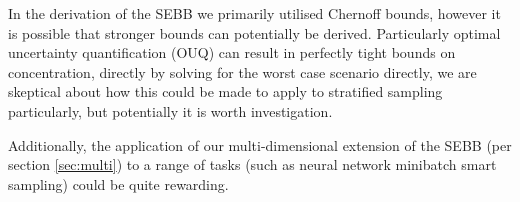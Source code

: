 In the derivation of the SEBB we primarily utilised Chernoff bounds, however it is possible that stronger bounds can potentially be derived.
Particularly optimal uncertainty quantification (OUQ) can result in perfectly tight bounds on concentration, directly by solving for the worst case scenario directly, we are skeptical about how this could be made to apply to stratified sampling particularly, but potentially it is worth investigation.\citep{OUQ1,doi:10.1137/13094712X}

Additionally, the application of our multi-dimensional extension of the SEBB (per section \ref{sec:multi}) to a range of tasks (such as neural network minibatch smart sampling) could be quite rewarding.









